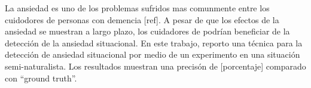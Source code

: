 La ansiedad es uno de los problemas sufridos mas comunmente entre los cuidodores de personas con demencia [ref]. A pesar de que los efectos de la ansiedad se muestran a largo plazo, los cuidadores de podr\'ian beneficiar de la detecci\'on de la ansiedad situacional. En este trabajo, reporto una t\'ecnica para la detecci\'on de ansiedad situacional por medio de un experimento en una situaci\'on semi-naturalista. Los resultados muestran una precis\'on de [porcentaje] comparado con  ``ground truth''.

